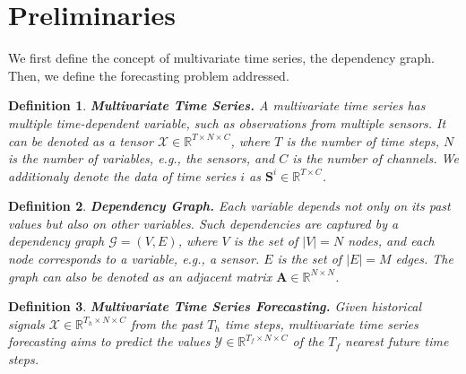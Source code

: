 \documentclass[sigconf]{acmart}
\newcommand{\eg}{\textit{e.g.,}\xspace}
\newtheorem{definition}{Definition}
\begin{document}
 \section{Preliminaries}
We first define the concept of multivariate time series, the dependency graph.
Then, we define the forecasting problem addressed.

\begin{definition}
\textbf{Multivariate Time Series.}
A multivariate time series has multiple time-dependent variable, such as observations from multiple sensors.
It can be denoted as a tensor $\mathcal{X}\in\mathbb{R}^{T\times N\times C}$, where $T$ is the number of time steps, $N$ is the number of variables, \eg the sensors, and $C$ is the number of channels.
We additionaly denote the data of time series $i$ as $\mathbf{S}^i\in\mathbb{R}^{T\times C}$.
\end{definition}

\begin{definition}
\textbf{Dependency Graph.}
Each variable depends not only on its past values but also on other variables. Such dependencies are captured by a dependency graph $\mathcal{G}=(V, E)$, where $V$ is the set of $|V|=N$ nodes, and each node corresponds to a variable, \eg a sensor. $E$ is the set of $|E|=M$ edges.
The graph can also be denoted as an adjacent matrix $\mathbf{A}\in\mathbb{R}^{N\times N}$.
\end{definition}

\begin{definition}
\textbf{Multivariate Time Series Forecasting.}
Given historical signals $\mathcal{X}\in\mathbb{R}^{T_h\times N\times C}$ from the past $T_h$ time steps, multivariate time series forecasting aims to predict the values $\mathcal{Y}\in\mathbb{R}^{T_f\times N\times C}$ of the $T_f$ nearest future time steps.
\end{definition}
\end{document}
